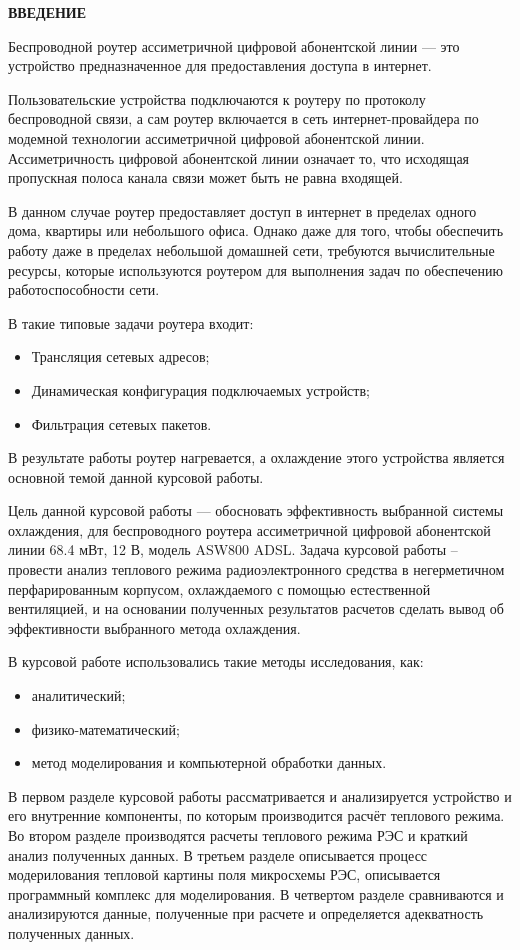 \begin{center}
\textbf{ВВЕДЕНИЕ}
\end{center}

\par
Беспроводной роутер ассиметричной цифровой абонентской линии — это
устройство предназначенное для предоставления доступа в интернет.
\par
Пользовательские устройства подключаются к роутеру по протоколу
беспроводной связи, а сам роутер включается в сеть интернет-провайдера
по модемной технологии ассиметричной цифровой абонентской линии.
Ассиметричность цифровой абонентской линии означает то, что исходящая
пропускная полоса канала связи может быть не равна входящей.
\par
В данном случае роутер предоставляет доступ в интернет в пределах
одного дома, квартиры или небольшого офиса.
Однако даже для того, чтобы обеспечить работу даже в пределах
небольшой домашней сети, требуются вычислительные ресурсы,
которые используются роутером для выполнения задач
по обеспечению работоспособности сети.
\par
В такие типовые задачи роутера входит:
\begin{itemize}[nosep]

\item Трансляция сетевых адресов;
\item Динамическая конфигурация подключаемых устройств;
\item Фильтрация сетевых пакетов.
\end{itemize}
В результате работы роутер нагревается, а охлаждение этого устройства
является основной темой данной курсовой работы.
\par
Цель данной курсовой работы — обосновать эффективность выбранной
системы охлаждения, для беспроводного роутера ассиметричной цифровой
абонентской линии 68.4 мВт, 12 В, модель ASW800 ADSL.
Задача курсовой работы – провести анализ теплового режима
радиоэлектронного средства в негерметичном перфарированным корпусом,
охлаждаемого с помощью естественной вентиляцией, и на основании
полученных результатов расчетов сделать вывод об эффективности
выбранного метода охлаждения.
\par
В курсовой работе использовались такие методы исследования, как:
\begin{itemize}[nosep]
\item аналитический;
\item физико-математический;
\item метод моделирования и компьютерной обработки данных.  
\end{itemize}
В первом разделе курсовой работы рассматривается и анализируется
устройство и его внутренние компоненты, по которым производится
расчёт теплового режима. Во втором разделе производятся расчеты
теплового режима РЭС и краткий анализ полученных данных.
В третьем разделе описывается процесс модерилования тепловой
картины поля микросхемы РЭС, описывается программный комплекс для моделирования.
В четвертом разделе сравниваются и анализируются данные, полученные при расчете
и определяется адекватность полученных данных.

\newpage
